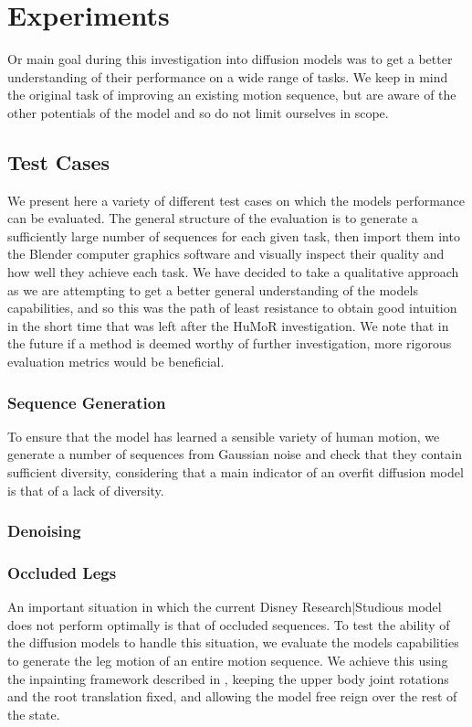 \section{Experiments}
\label{sec:diffusion_experiments}

Or main goal during this investigation into diffusion models was to get a better understanding of their performance on a wide range of tasks. We keep in mind the original task of improving an existing motion sequence, but are aware of the other potentials of the model and so do not limit ourselves in scope.


\subsection{Test Cases}
We present here a variety of different test cases on which the models performance can be evaluated. The general structure of the evaluation is to generate a sufficiently large number of sequences for each given task, then import them into the Blender computer graphics software and visually inspect their quality and how well they achieve each task. We have decided to take a qualitative approach as we are attempting to get a better general understanding of the models capabilities, and so this was the path of least resistance to obtain good intuition in the short time that was left after the HuMoR investigation. We note that in the future if a method is deemed worthy of further investigation, more rigorous evaluation metrics would be beneficial.

\subsubsection{Sequence Generation}
To ensure that the model has learned a sensible variety of human motion, we generate a number of sequences from Gaussian noise and check that they contain sufficient diversity, considering that a main indicator of an overfit diffusion model is that of a lack of diversity.

\subsubsection{Denoising}

\subsubsection{Occluded Legs}
An important situation in which the current Disney Research|Studious model does not perform optimally is that of occluded sequences. To test the ability of the diffusion models to handle this situation, we evaluate the models capabilities to generate the leg motion of an entire motion sequence. We achieve this using the inpainting framework described in , keeping the upper body joint rotations and the root translation fixed, and allowing the model free reign over the rest of the state.

